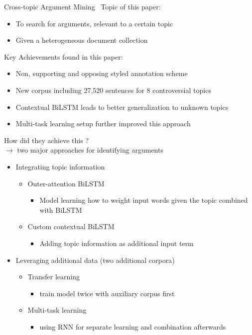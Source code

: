 \documentclass[english,handout]{mlutalk}
\begin{document}
\begin{frame}[allowframebreaks]{Cross-topic Argument Mining~\cite{StabMSRG2018}}
  Topic of this paper:
  \begin{itemize}
    \item To search for arguments, relevant to a certain topic 
    \item Given a heterogeneous document collection
  \end{itemize}
  Key Achievements found in this paper:
  \begin{itemize}
    \item Non, supporting and opposing styled annotation scheme
    \item New corpus including 27,520 sentences for 8 controversial topics
    \item Contextual BiLSTM leads to better generalization to unknown topics
    \item Multi-task learning setup further improved this approach 
  \end{itemize}
  
  \framebreak

  How did they achieve this ?\\ %
  $\rightarrow$ two major approaches for identifying arguments
  \begin{itemize}
    \item Integrating topic information
    \begin{itemize}
      \item Outer-attention BiLSTM 
      \begin{itemize}
        \item Model learning how to weight input words given the topic combined with BiLSTM
      \end{itemize}
      \item Custom contextual BiLSTM
      \begin{itemize}
        \item Adding topic information as additional input term 
      \end{itemize}
    \end{itemize}
    \item Leveraging additional data (two additional corpora)
    \begin{itemize}
      \item Transfer learning
      \begin{itemize}
        \item train model twice with auxiliary corpus first 
      \end{itemize}
      \item Multi-task learning
      \begin{itemize}
        \item using RNN for separate learning and combination afterwards
      \end{itemize}
    \end{itemize}
  \end{itemize}
\end{frame}
\end{document}
